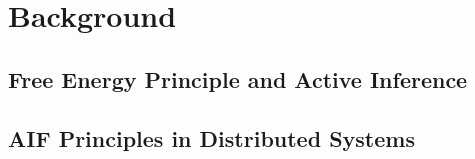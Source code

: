 \chapter{Background}
\section{Free Energy Principle and Active Inference}
\section{AIF Principles in Distributed Systems}